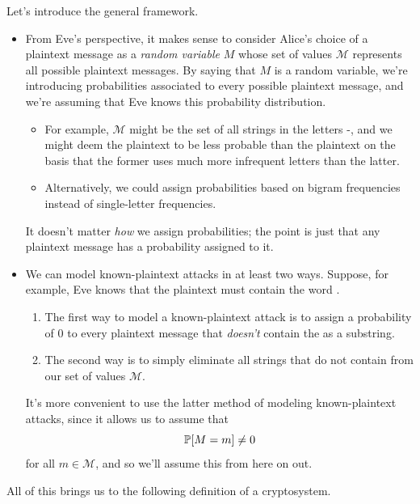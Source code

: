 \documentclass[letterpaper]{article}
\begin{document}
\bigskip 

Let's introduce the general framework. 
\begin{itemize}
    \item From Eve's perspective, it makes sense to consider Alice's choice of a plaintext message as a \emph{random variable} $M$ whose set of values $\mathscr{M}$ represents all possible plaintext messages. By saying that $M$ is a random variable, we're introducing probabilities associated to every possible plaintext message, and we're assuming that Eve knows this probability distribution. 
    \begin{itemize}
        \item For example, $\mathscr{M}$ might be the set of all strings in the letters -, and we might deem the plaintext  to be less probable than the plaintext  on the basis that the former uses much more infrequent letters than the latter. 
        \item Alternatively, we could assign probabilities based on bigram frequencies instead of single-letter frequencies. 
    \end{itemize}
    It doesn't matter \emph{how} we assign probabilities; the point is just that any plaintext message has a probability assigned to it. 

    \item We can model known-plaintext attacks in at least two ways. Suppose, for example, Eve knows that the plaintext must contain the word . 
    \begin{enumerate}
        \item The first way to model a known-plaintext attack is to assign a probability of 0 to every plaintext message that \emph{doesn't} contain the  as a substring. 
        \item The second way is to simply eliminate all strings that do not contain  from our set of values $\mathscr{M}$. 
    \end{enumerate}
    It's more convenient to use the latter method of modeling known-plaintext attacks, since it allows us to assume that \[\mathbb{P}[M = m] \neq 0\] for all $m \in \mathscr{M}$, and so we'll assume this from here on out.  
\end{itemize}
All of this brings us to the following definition of a cryptosystem. 
\end{document}
